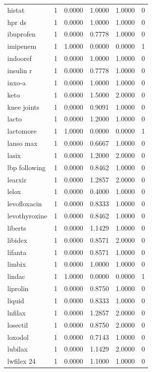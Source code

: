 \begin{longtable}{p{3.0cm}rrrrr}
histat & 1 & 0.0000 & 1.0000 & 1.0000 & 0 \\
hpr ds & 1 & 0.0000 & 1.0000 & 1.0000 & 0 \\
ibuprofen & 1 & 0.0000 & 0.7778 & 1.0000 & 0 \\
imipenem & 1 & 1.0000 & 0.0000 & 0.0000 & 1 \\
indooref & 1 & 0.0000 & 1.0000 & 1.0000 & 0 \\
insulin r & 1 & 0.0000 & 0.7778 & 1.0000 & 0 \\
inxo-a & 1 & 0.0000 & 1.0000 & 1.0000 & 0 \\
keto & 1 & 0.0000 & 1.5000 & 2.0000 & 0 \\
knee joints & 1 & 0.0000 & 0.9091 & 1.0000 & 0 \\
lacto & 1 & 0.0000 & 1.2000 & 1.0000 & 0 \\
lactomore & 1 & 1.0000 & 0.0000 & 0.0000 & 1 \\
lanso max & 1 & 0.0000 & 0.6667 & 1.0000 & 0 \\
lasix & 1 & 0.0000 & 1.2000 & 2.0000 & 0 \\
lbp following & 1 & 0.0000 & 0.8462 & 1.0000 & 0 \\
learxir & 1 & 0.0000 & 1.2857 & 2.0000 & 0 \\
lelox & 1 & 0.0000 & 0.4000 & 1.0000 & 0 \\
levofloxacin & 1 & 0.0000 & 0.8333 & 1.0000 & 0 \\
levothyroxine & 1 & 0.0000 & 0.8462 & 1.0000 & 0 \\
liberts & 1 & 0.0000 & 1.1429 & 1.0000 & 0 \\
libidex & 1 & 0.0000 & 0.8571 & 2.0000 & 0 \\
lifanta & 1 & 0.0000 & 0.8571 & 1.0000 & 0 \\
limbix & 1 & 0.0000 & 1.0000 & 1.0000 & 0 \\
lindac & 1 & 1.0000 & 0.0000 & 0.0000 & 1 \\
liprolin & 1 & 0.0000 & 0.8750 & 1.0000 & 0 \\
liquid & 1 & 0.0000 & 0.8333 & 1.0000 & 0 \\
lnfilax & 1 & 0.0000 & 1.2857 & 2.0000 & 0 \\
losectil & 1 & 0.0000 & 0.8750 & 2.0000 & 0 \\
loxodol & 1 & 0.0000 & 0.7143 & 1.0000 & 0 \\
lubilax & 1 & 0.0000 & 1.1429 & 2.0000 & 0 \\
lwfilex 24 & 1 & 0.0000 & 1.1000 & 1.0000 & 0 \\

\end{longtable}
